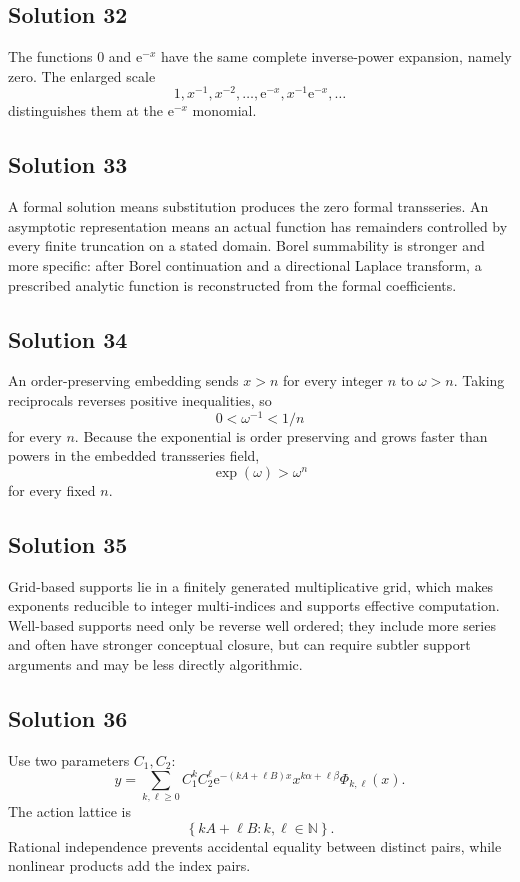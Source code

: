 \documentclass[11pt,openany]{book}
\theoremstyle{plain}
\theoremstyle{definition}
\theoremstyle{remark}
\newcommand{\N}{\mathbb{N}}
\newcommand{\e}{\mathrm{e}}
\newcommand{\set}[1]{\left\{#1\right\}}
\begin{document}
\subsection*{Solution 32}
The functions $0$ and $\e^{-x}$ have the same complete inverse-power expansion, namely zero. The enlarged scale
\[
  1,x^{-1},x^{-2},\ldots,\e^{-x},x^{-1}\e^{-x},\ldots
\]
distinguishes them at the $\e^{-x}$ monomial.

\subsection*{Solution 33}
A formal solution means substitution produces the zero formal transseries. An asymptotic representation means an actual function has remainders controlled by every finite truncation on a stated domain. Borel summability is stronger and more specific: after Borel continuation and a directional Laplace transform, a prescribed analytic function is reconstructed from the formal coefficients.

\subsection*{Solution 34}
An order-preserving embedding sends $x>n$ for every integer $n$ to $\omega>n$. Taking reciprocals reverses positive inequalities, so
\[
  0<\omega^{-1}<1/n
\]
for every $n$. Because the exponential is order preserving and grows faster than powers in the embedded transseries field,
\[
  \exp(\omega)>\omega^n
\]
for every fixed $n$.

\subsection*{Solution 35}
Grid-based supports lie in a finitely generated multiplicative grid, which makes exponents reducible to integer multi-indices and supports effective computation. Well-based supports need only be reverse well ordered; they include more series and often have stronger conceptual closure, but can require subtler support arguments and may be less directly algorithmic.

\subsection*{Solution 36}
Use two parameters $C_1,C_2$:
\[
 y=\sum_{k,\ell\ge0}
 C_1^kC_2^\ell
 \e^{-(kA+\ell B)x}
 x^{k\alpha+\ell\beta}\Phi_{k,\ell}(x).
\]
The action lattice is
\[
  \set{kA+\ell B:k,\ell\in\N}.
\]
Rational independence prevents accidental equality between distinct pairs, while nonlinear products add the index pairs.
\end{document}
